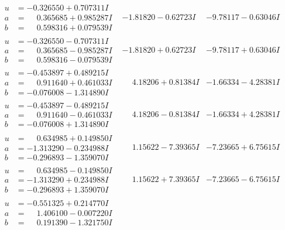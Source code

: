 \documentclass[1p]{elsarticle_modified}
\theoremstyle{definition}
\begin{document}
$$\begin{array}{c|c|c}
\begin{aligned}
u &= -0.326550 + 0.707311 I \\
a &= \phantom{-}0.365685 + 0.985287 I \\
b &= \phantom{-}0.598316 + 0.079539 I\end{aligned}
 & -1.81820 - 0.62723 I & -9.78117 - 0.63046 I \\ \hline\begin{aligned}
u &= -0.326550 - 0.707311 I \\
a &= \phantom{-}0.365685 - 0.985287 I \\
b &= \phantom{-}0.598316 - 0.079539 I\end{aligned}
 & -1.81820 + 0.62723 I & -9.78117 + 0.63046 I \\ \hline\begin{aligned}
u &= -0.453897 + 0.489215 I \\
a &= \phantom{-}0.911640 + 0.461033 I \\
b &= -0.076008 - 1.314890 I\end{aligned}
 & \phantom{-}4.18206 + 0.81384 I & -1.66334 - 4.28381 I \\ \hline\begin{aligned}
u &= -0.453897 - 0.489215 I \\
a &= \phantom{-}0.911640 - 0.461033 I \\
b &= -0.076008 + 1.314890 I\end{aligned}
 & \phantom{-}4.18206 - 0.81384 I & -1.66334 + 4.28381 I \\ \hline\begin{aligned}
u &= \phantom{-}0.634985 + 0.149850 I \\
a &= -1.313290 - 0.234988 I \\
b &= -0.296893 - 1.359070 I\end{aligned}
 & \phantom{-}1.15622 - 7.39365 I & -7.23665 + 6.75615 I \\ \hline\begin{aligned}
u &= \phantom{-}0.634985 - 0.149850 I \\
a &= -1.313290 + 0.234988 I \\
b &= -0.296893 + 1.359070 I\end{aligned}
 & \phantom{-}1.15622 + 7.39365 I & -7.23665 - 6.75615 I \\ \hline\begin{aligned}
u &= -0.551325 + 0.214770 I \\
a &= \phantom{-}1.406100 - 0.007220 I \\
b &= \phantom{-}0.191390 - 1.321750 I\end{aligned}

\end{array}$$
\end{document}
